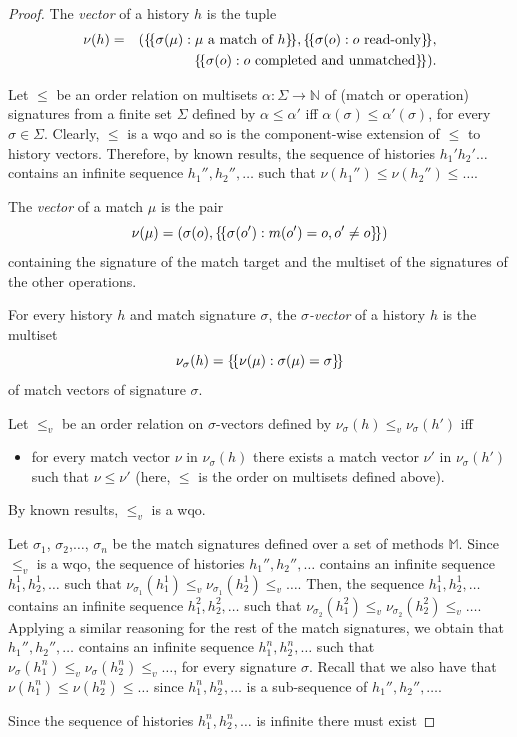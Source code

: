 \begin{proof}
%

The \emph{vector} of a history $h$ is the tuple
\begin{align*}
\nu(h)&=&({\{\!\{ \sigma(\mu): \mu\mbox{ a match of $h$} \}\!\}}, {\{\!\{ \sigma(o): o\mbox{ read-only} \}\!\}}, \\
&& {\{\!\{ \sigma(o): o\mbox{ completed and unmatched} \}\!\}}).
\end{align*}

Let $\leq$ be an order relation on multisets $\alpha:\Sigma\rightarrow\mathbb{N}$ of (match or operation) signatures from a finite set $\Sigma$ 
defined by $\alpha\leq\alpha'$ iff $\alpha(\sigma)\leq\alpha'(\sigma)$, for every $\sigma\in\Sigma$.
Clearly, $\leq$ is a wqo and so is the component-wise extension of $\leq$ to history vectors.
Therefore, by known results, the sequence of histories $h_1' h_2' \ldots$ contains 
an infinite sequence $h_1'',h_2'',\ldots$ such that $\nu(h_1'')\leq \nu(h_2'')\leq \ldots$.

The \emph{vector} of a match $\mu$ is the pair
\[
\nu(\mu)=(\sigma(o),{\{\!\{ \sigma(o') : m(o')=o, o'\neq o \}\!\}})
\]
containing the signature of the match target and the multiset of the signatures of the other operations.

For every history $h$ and match signature $\sigma$, the \emph{$\sigma$-vector} of a history $h$ is the multiset
\[
\nu_\sigma(h)={\{\!\{ \nu(\mu): \sigma(\mu)=\sigma \}\!\}}
\]
of match vectors of signature $\sigma$.

Let $\leq_v$ be an order relation on $\sigma$-vectors defined by $\nu_\sigma(h)\leq_v \nu_\sigma(h')$ iff
\begin{itemize}
	\item for every match vector $\nu$ in $\nu_\sigma(h)$ there exists a match vector $\nu'$ in $\nu_\sigma(h')$
	such that $\nu\leq \nu'$ (here, $\leq$ is the order on multisets defined above).
\end{itemize}
By known results, $\leq_v$ is a wqo.

Let $\sigma_1$, $\sigma_2$,$\ldots$, $\sigma_n$ be the match signatures defined over a set of methods $\mathbb{M}$.
Since $\leq_v$ is a wqo, the sequence of histories $h_1'',h_2'',\ldots$ contains an 
infinite sequence $h_{1}^1,h_{2}^1,\ldots$ such that 
$\nu_{\sigma_1}(h_{1}^1)\leq_v \nu_{\sigma_1}(h_{2}^1)\leq_v \ldots$.
Then, the sequence $h_{1}^1,h_{2}^1,\ldots$ contains 
an infinite sequence $h_{1}^2,h_{2}^2,\ldots$ such that 
$\nu_{\sigma_2}(h_{1}^2)\leq_v \nu_{\sigma_2}(h_{2}^2)\leq_v \ldots$.
Applying a similar reasoning for the rest of the match signatures, 
we obtain that $h_1'',h_2'',\ldots$ contains an 
infinite sequence $h_{1}^n,h_{2}^n,\ldots$
such that 
$\nu_{\sigma}(h_{1}^n)\leq_v \nu_{\sigma}(h_{2}^n)\leq_v \ldots$, for every signature $\sigma$.
Recall that we also have that
$\nu(h_1^n)\leq\nu(h_2^n)\leq\ldots$ since $h_{1}^n,h_{2}^n,\ldots$ is a sub-sequence of $h_1'',h_2'',\ldots$.

Since the sequence of histories $h_{1}^n,h_{2}^n,\ldots$ is infinite there must exist




\end{proof}


